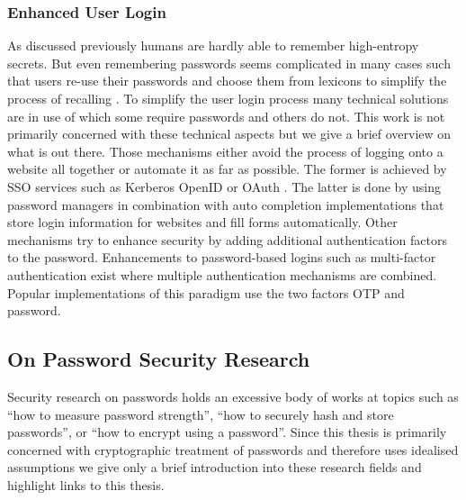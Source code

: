 \subsubsection{Enhanced User Login} \label{sec:enhanced-login}
As discussed previously humans are hardly able to remember high-entropy secrets.
But even remembering passwords seems complicated in many cases such that users re-use their passwords and choose them from lexicons to simplify the process of recalling \cite{Gaw2006,Florencio2007}.
To simplify the user login process many technical solutions are in use of which some require passwords and others do not.
This work is not primarily concerned with these technical aspects but we give a brief overview on what is out there.
Those mechanisms either avoid the process of logging onto a website all together or automate it as far as possible.
The former is achieved by \ac{SSO} services such as Kerberos \cite{rfc4120} OpenID \cite{OpenID} or OAuth \cite{rfc6749}.
The latter is done by using password managers in combination with auto completion implementations that store login information for websites and fill forms automatically.
Other mechanisms try to enhance security by adding additional authentication factors to the password.
Enhancements to password-based logins such as multi-factor authentication \cite{FleischhackerMA14} exist where multiple authentication mechanisms are combined.
Popular implementations of this paradigm use the two factors \ac{OTP} and password. %


\subsection{On Password Security Research}
Security research on passwords holds an excessive body of works at topics such as ``how to measure password strength'', ``how to securely hash and store passwords'', or ``how to encrypt using a password''.
Since this thesis is primarily concerned with cryptographic treatment of passwords and therefore uses idealised assumptions we give only a brief introduction into these research fields and highlight links to this thesis.

